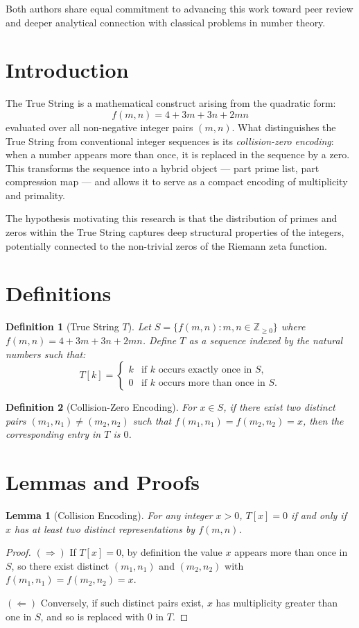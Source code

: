 \documentclass[12pt]{article}
\newtheorem{lemma}{Lemma}[section]
\newtheorem{definition}{Definition}[section]
\begin{document}
Both authors share equal commitment to advancing this work toward peer review and deeper analytical connection with classical problems in number theory.

\newpage

\section{Introduction}
The True String is a mathematical construct arising from the quadratic form:
\[
f(m,n) = 4 + 3m + 3n + 2mn
\]
evaluated over all non-negative integer pairs $(m,n)$. What distinguishes the True String from conventional integer sequences is its \textit{collision-zero encoding}: when a number appears more than once, it is replaced in the sequence by a zero. This transforms the sequence into a hybrid object — part prime list, part compression map — and allows it to serve as a compact encoding of multiplicity and primality.

The hypothesis motivating this research is that the distribution of primes and zeros within the True String captures deep structural properties of the integers, potentially connected to the non-trivial zeros of the Riemann zeta function.

\section{Definitions}
\begin{definition}[True String $T$]
Let $S = \{ f(m,n) : m,n \in \mathbb{Z}_{\geq 0} \}$ where $f(m,n) = 4 + 3m + 3n + 2mn$.  
Define $T$ as a sequence indexed by the natural numbers such that:
\[
T[k] =
\begin{cases}
k & \text{if $k$ occurs exactly once in $S$}, \\
0 & \text{if $k$ occurs more than once in $S$}.
\end{cases}
\]
\end{definition}

\begin{definition}[Collision-Zero Encoding]
For $x \in S$, if there exist two distinct pairs $(m_1,n_1) \neq (m_2,n_2)$ such that $f(m_1,n_1) = f(m_2,n_2) = x$, then the corresponding entry in $T$ is $0$.
\end{definition}

\section{Lemmas and Proofs}
\begin{lemma}[Collision Encoding]
For any integer $x > 0$, $T[x] = 0$ if and only if $x$ has at least two distinct representations by $f(m,n)$.
\end{lemma}
\begin{proof}
$(\Rightarrow)$ If $T[x] = 0$, by definition the value $x$ appears more than once in $S$, so there exist distinct $(m_1,n_1)$ and $(m_2,n_2)$ with $f(m_1,n_1) = f(m_2,n_2) = x$.  

$(\Leftarrow)$ Conversely, if such distinct pairs exist, $x$ has multiplicity greater than one in $S$, and so is replaced with $0$ in $T$.  
\end{proof}
\end{document}
